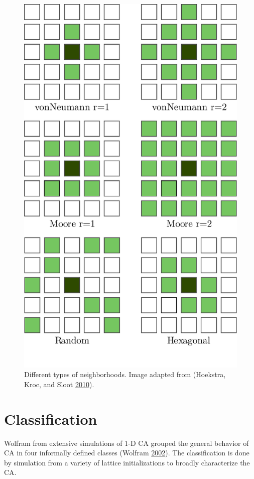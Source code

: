 \documentclass[
  12pt,
  openany]{book}
\begin{document}
\begin{figure}

{\centering \includegraphics[width=0.8\linewidth]{pics/neighborhoods} 

}

\caption{Different types of neighborhoods. Image adapted from (Hoekstra, Kroc, and Sloot \protect\hyperlink{ref-hoekstra2010simulating}{2010}).}\label{fig:CA-neighborhoods}
\end{figure}

\hypertarget{classification}{%
\section{Classification}\label{classification}}

Wolfram from extensive simulations of \(1\)-D CA grouped the general behavior of CA in four informally defined classes (Wolfram \protect\hyperlink{ref-wolfram2002new}{2002}). The classification is done by simulation from a variety of lattice initializations to broadly characterize the CA.
\end{document}
